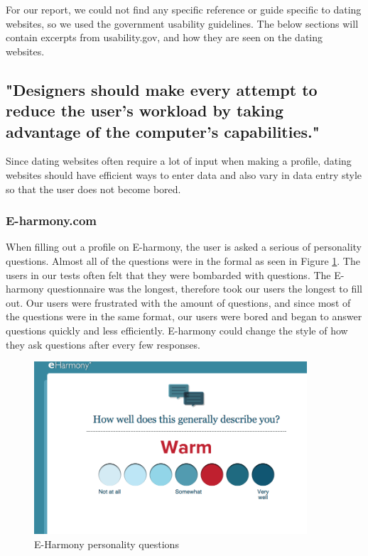 \documentclass{article}
\begin{document}
For our report, we could not find any specific reference or guide specific to dating websites, so we used the government usability guidelines. The below sections will contain excerpts from usability.gov, and how they are seen on the dating websites.

\subsection{"Designers should make every attempt to reduce the user’s workload by taking advantage of the computer’s capabilities."}
Since dating websites often require a lot of input when making a profile, dating websites should have efficient ways to enter data and also vary in data entry style so that the user does not become bored.

\subsubsection{E-harmony.com}
When filling out a profile on E-harmony, the user is asked a serious of personality questions. Almost all of the questions were in the formal as seen in Figure \ref{Eharm1}. The users in our tests often felt that they were bombarded with questions. The E-harmony questionnaire was the longest, therefore took our users the longest to fill out. Our users were frustrated with the amount of questions, and since most of the questions were in the same format, our users were bored and began to answer questions quickly and less efficiently. E-harmony could change the style of how they ask questions after every few responses.

\begin{figure}
\centering
\includegraphics[width=4in]{Eharm1.png} 

\caption{E-Harmony personality questions}
\label{Eharm1}
\end{figure}
\end{document}

